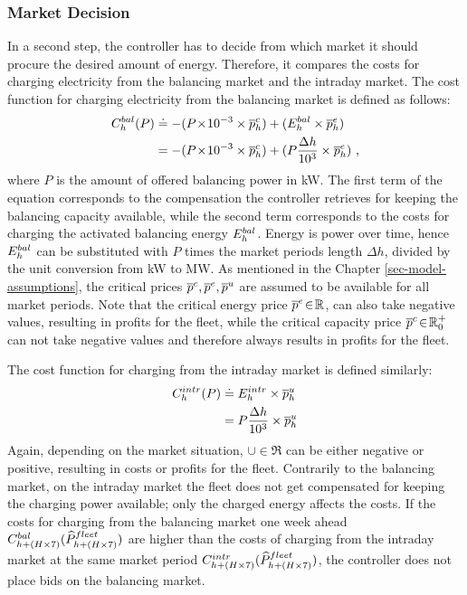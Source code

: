 \documentclass[a4paper, 12pt]{article}
\begin{document}
\subsubsection{Market Decision}
\label{sec:org7006503}
In a second step, the controller has to decide from which market it should
procure the desired amount of energy. Therefore, it compares the costs for
charging electricity from the balancing market and the intraday market. The cost
function for charging electricity from the balancing market is defined as follows:
\begin{equation} \label{eq-cost-balancing}
\begin{split}
    C^{bal}_{h}(P) &\doteq  -(P\!\times\!10^{-3} \times \overline p^c_{h}) + (E^{bal}_{h} \times \overline p^e_{h}) \\
    &= -(P\!\times\!10^{-3} \times \overline p^c_{h}) + (P \frac{\Delta h}{10^{3}} \times \overline p^e_{h}) \text{ ,}
\end{split}
\end{equation}
where \(P\) is the amount of offered balancing power in kW. The first term of the
equation corresponds to the compensation the controller retrieves for keeping
the balancing capacity available, while the second term corresponds to the costs
for charging the activated balancing energy \(E^{bal}_{h}\). Energy is power over time,
hence \(E^{bal}_{h}\) can be substituted with \(P\) times the market periods length
\(\Delta{h}\), divided by the unit conversion from kW to MW. As mentioned in the
Chapter \ref{sec-model-assumptions}, the critical prices \(\overline p^c_{}, \overline p^e_{}, \overline p^u_{}\)
are assumed to be available for all market periods. Note that the critical
energy price \(\overline p^e_{}\!\in\!\mathbb{R}\), can also take negative values, resulting in
profits for the fleet, while the critical capacity price \(\overline p^c_{}\!\in\! \mathbb{R}^+_0\)
can not take negative values and therefore always results in profits for the fleet.

The cost function for charging from the intraday market is defined similarly:
\begin{equation}
\begin{split}
    C^{intr}_{h}(P) &\doteq E^{intr}_{h} \times \overline p^u_{h} \\
    &= P \frac{\Delta h}{10^{3}}\times \overline p^u_{h}
\end{split}
\end{equation}
Again, depending on the market situation, \(\cup{}\!\in\!\Re\) can be either
negative or positive, resulting in costs or profits for the fleet. Contrarily to
the balancing market, on the intraday market the fleet does not get compensated
for keeping the charging power available; only the charged energy affects the
costs. If the costs for charging from the balancing market one week ahead
\(C^{bal}_{h + (H \times 7)}(\widehat{P}^{fleet}_{h + (H \times 7)})\) are higher than the costs of
charging from the intraday market at the same market period \(C^{intr}_{h + (H \times
7)}(\widehat{P}^{fleet}_{h + (H \times 7)})\), the controller does not place bids on the
balancing market.
\end{document}
